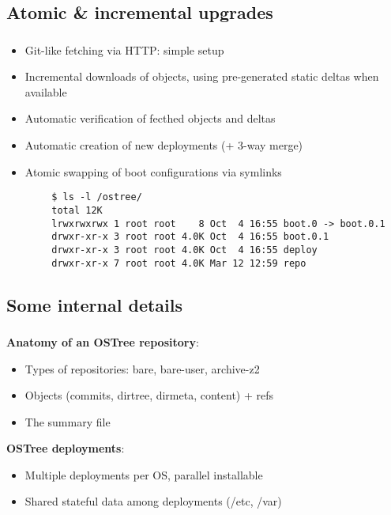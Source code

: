\subsection{Atomic \& incremental upgrades}
\begin{frame}[fragile]
  \frametitle{\insertsubsection}

    \begin{itemize}
    \item Git-like fetching via HTTP: simple setup\vspacing
    \item Incremental downloads of objects, using pre-generated static deltas when available\vspacing
    \item Automatic verification of fecthed objects and deltas\vspacing
    \item Automatic creation of new deployments (+ 3-way merge)\vspacing
    \item Atomic swapping of boot configurations via symlinks
    \end{itemize}

    \begin{tiny}
\begin{verbatim}
        $ ls -l /ostree/
        total 12K
        lrwxrwxrwx 1 root root    8 Oct  4 16:55 boot.0 -> boot.0.1
        drwxr-xr-x 3 root root 4.0K Oct  4 16:55 boot.0.1
        drwxr-xr-x 3 root root 4.0K Oct  4 16:55 deploy
        drwxr-xr-x 7 root root 4.0K Mar 12 12:59 repo
\end{verbatim}
  \end{tiny}

\end{frame}

\subsection{Some internal details}
\begin{frame}
  \frametitle{\insertsubsection}

  \textbf{Anatomy of an OSTree repository}:
  \begin{itemize}
  \item Types of repositories: bare, bare-user, archive-z2\vspacing
  \item Objects (commits, dirtree, dirmeta, content) + refs\vspacing
  \item The summary file\vspacing
  \end{itemize}

  \textbf{OSTree deployments}:
  \begin{itemize}
  \item Multiple deployments per OS, parallel installable\vspacing
  \item Shared stateful data among deployments (/etc, /var)
  \end{itemize}
\end{frame}

